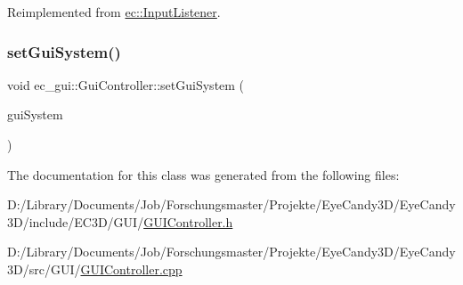 Reimplemented from \mbox{\hyperlink{classec_1_1_input_listener_a9ceaefc79c6b0b260e88454616137840}{ec\+::\+Input\+Listener}}.

\mbox{\label{classec__gui_1_1_gui_controller_a8626a59627393e9a612563164f71f764}} 
\subsubsection{\texorpdfstring{set\+Gui\+System()}{setGuiSystem()}}
{\footnotesize\ttfamily void ec\+\_\+gui\+::\+Gui\+Controller\+::set\+Gui\+System (\begin{DoxyParamCaption}\item[{\mbox{\hyperlink{classec__gui_1_1_gui_system}{Gui\+System}} $\ast$}]{gui\+System }\end{DoxyParamCaption})}



The documentation for this class was generated from the following files\+:\begin{DoxyCompactItemize}
\item 
D\+:/\+Library/\+Documents/\+Job/\+Forschungsmaster/\+Projekte/\+Eye\+Candy3\+D/\+Eye\+Candy3\+D/include/\+E\+C3\+D/\+G\+U\+I/\mbox{\hyperlink{_g_u_i_controller_8h}{G\+U\+I\+Controller.\+h}}\item 
D\+:/\+Library/\+Documents/\+Job/\+Forschungsmaster/\+Projekte/\+Eye\+Candy3\+D/\+Eye\+Candy3\+D/src/\+G\+U\+I/\mbox{\hyperlink{_g_u_i_controller_8cpp}{G\+U\+I\+Controller.\+cpp}}\end{DoxyCompactItemize}
